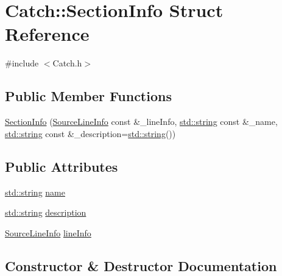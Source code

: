 \hypertarget{struct_catch_1_1_section_info}{}\section{Catch\+:\+:Section\+Info Struct Reference}
\label{struct_catch_1_1_section_info}


{\ttfamily \#include $<$Catch.\+h$>$}

\subsection*{Public Member Functions}
\begin{DoxyCompactItemize}
\item 
\hyperlink{struct_catch_1_1_section_info_a27aff3aaf8b6611f3651b17111a272c6}{Section\+Info} (\hyperlink{struct_catch_1_1_source_line_info}{Source\+Line\+Info} const \&\+\_\+line\+Info, \hyperlink{_s_d_l__opengl__glext_8h_ae84541b4f3d8e1ea24ec0f466a8c568b}{std\+::string} const \&\+\_\+name, \hyperlink{_s_d_l__opengl__glext_8h_ae84541b4f3d8e1ea24ec0f466a8c568b}{std\+::string} const \&\+\_\+description=\hyperlink{_s_d_l__opengl__glext_8h_ae84541b4f3d8e1ea24ec0f466a8c568b}{std\+::string}())
\end{DoxyCompactItemize}
\subsection*{Public Attributes}
\begin{DoxyCompactItemize}
\item 
\hyperlink{_s_d_l__opengl__glext_8h_ae84541b4f3d8e1ea24ec0f466a8c568b}{std\+::string} \hyperlink{struct_catch_1_1_section_info_a704c8fc662d309137e0d4f199cb7df58}{name}
\item 
\hyperlink{_s_d_l__opengl__glext_8h_ae84541b4f3d8e1ea24ec0f466a8c568b}{std\+::string} \hyperlink{struct_catch_1_1_section_info_a0052060219a6de74bb7ade34d4163a4e}{description}
\item 
\hyperlink{struct_catch_1_1_source_line_info}{Source\+Line\+Info} \hyperlink{struct_catch_1_1_section_info_adbc83b8a3507c4acc8ee249e93465711}{line\+Info}
\end{DoxyCompactItemize}


\subsection{Constructor \& Destructor Documentation}
